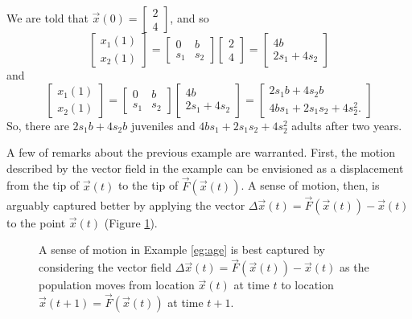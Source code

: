\documentclass[../book.tex]{subfiles}
\begin{document}
\begin{solution}
We are told that \(\vec{x}(0) = \begin{bmatrix} 2 \\ 4 \end{bmatrix}\), and so
\begin{equation}\label{eq:vec-35}
\begin{bmatrix}
  x_1 (1) \\ x_2(1)
\end{bmatrix}
=
\begin{bmatrix}
  0 & b \\
  s_1 & s_2 
\end{bmatrix}
\begin{bmatrix}
  2 \\ 4
\end{bmatrix}
=
\begin{bmatrix}
  4 b \\ 2 s_1 + 4 s_2
\end{bmatrix}
\end{equation}
and
\begin{equation}\label{eq:vec-36}
\begin{bmatrix}
  x_1 (1) \\ x_2(1)
\end{bmatrix}
=
\begin{bmatrix}
  0 & b \\
  s_1 & s_2 
\end{bmatrix}
\begin{bmatrix}
  4 b \\ 2 s_1 + 4 s_2
\end{bmatrix}
=
\begin{bmatrix}
  2 s_1  b + 4 s_2 b \\
  4 b s_1 + 2 s_1 s_2 + 4 s_2^2.
\end{bmatrix}
\end{equation}
So, there are \(2 s_1  b + 4 s_2 b\) juveniles and \(4 b s_1 + 2 s_1 s_2 + 4 s_2^2\) adults after two years.
\end{solution}

A few of remarks about the previous example are warranted. First, the motion described by the vector field in the example can be envisioned as a displacement from the tip of \(\vec{x}(t)\) to the tip of \(\vec{F}(\vec{x}(t))\).  A sense of motion, then, is arguably captured better by applying the vector \(\Delta\vec{x}(t)=\vec{F}(\vec{x}(t)) - \vec{x}(t)\) to the point \(\vec{x}(t)\) (Figure \ref{fig:dt_motion}).

\begin{figure}[htbp]
  \centering
  \caption{A sense of motion in Example \ref{eg:age} is best captured by considering the vector field \(\Delta\vec{x}(t)=\vec{F}(\vec{x}(t)) - \vec{x}(t)\) as the population moves from location \(\vec{x}(t)\) at time \(t\) to location \(\vec{x}(t+1) = \vec{F}(\vec{x}(t))\) at time \(t+1\).}
  \label{fig:dt_motion}
\end{figure}
\end{document}
